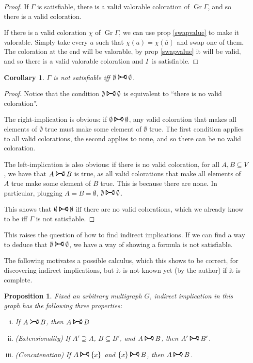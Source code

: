\documentclass[11pt]{article}
\newcommand{\conj}[1]{\overline{#1}}
\DeclareMathOperator{\Gr}{Gr}
\newcommand{\rightcurvearrow}{
\mathrel{
  \begin{tikzpicture}[scale=0.8]
    \draw[thick,->] (0,1ex) arc (30:150:-2ex);
    \draw[thick,->] (0,-1ex) arc (150:30:2ex);
  \end{tikzpicture}
}
}
\newcommand{\Rightcurvearrow}{
\mathrel{
  \begin{tikzpicture}[scale=0.8]
    \draw[thick,->] (0,1ex) arc (30:150:-2ex);
    \draw[thick,->] (0,-1ex) arc (150:30:2ex);
    \draw[thick] (0, 1ex) -- (0, -1ex);
  \end{tikzpicture}
}
}
\newtheorem{prop}{Proposition}
\newtheorem{corollary}{Corollary}
\begin{document}
\begin{proof}
If $\Gamma$ is satisfiable, there is a valid valorable coloration of $\Gr \Gamma$, and so there is a valid coloration.

If there is a valid coloration $\chi$ of $\Gr \Gamma$, we can use prop \ref{swapvalue} to make it valorable. Simply take every $a$ such that $\chi(a) = \chi(\conj a)$ and swap one of them. The coloration at the end will be valorable, by prop \ref{swapvalue} it will be valid, and so there is a valid valorable coloration and $\Gamma$ is satisfiable.
\end{proof}

\begin{corollary}
$\Gamma$ is not satisfiable iff $\emptyset \Rightcurvearrow \emptyset$.
\end{corollary}

\begin{proof}
Notice that the condition $\emptyset \Rightcurvearrow \emptyset$ is equivalent to ``there is no valid coloration''.

The right-implication is obvious: if $\emptyset \Rightcurvearrow \emptyset$, any valid coloration that makes all elements of $\emptyset$ true must make some element of $\emptyset$ true. The first condition applies to all valid colorations, the second applies to none, and so there can be no valid coloration.

The left-implication is also obvious: if there is no valid coloration, for all $A, B \subseteq V$, we have that $A \Rightcurvearrow B$ is true, as all valid colorations that make all elements of $A$ true make some element of $B$ true. This is because there are none. In particular, plugging $A = B = \emptyset$, $\emptyset \Rightcurvearrow \emptyset$.

This shows that $\emptyset \Rightcurvearrow \emptyset$ iff there are no valid colorations, which we already know to be iff $\Gamma$ is not satisfiable.
\end{proof}

This raises the question of how to find indirect implications. If we can find a way to deduce that $\emptyset \Rightcurvearrow \emptyset$, we have a way of showing a formula is not satisfiable.

The following motivates a possible calculus, which this shows to be correct, for discovering indirect implications, but it is not known yet (by the author) if it is complete.

\begin{prop}
Fixed an arbitrary multigraph $G$, indirect implication in this graph has the following three properties:

\begin{enumerate}[i)]
\item If $A \rightcurvearrow B$, then $A \Rightcurvearrow B$
\item (Extensionality) If $A' \supseteq A$, $B \subseteq B'$, and $A \Rightcurvearrow B$, then $A' \Rightcurvearrow B'$.
\item (Concatenation) If $A \Rightcurvearrow \{x\}$ and $\{x\} \Rightcurvearrow B$, then $A \Rightcurvearrow B$.
\end{enumerate}
\end{prop}
\end{document}
